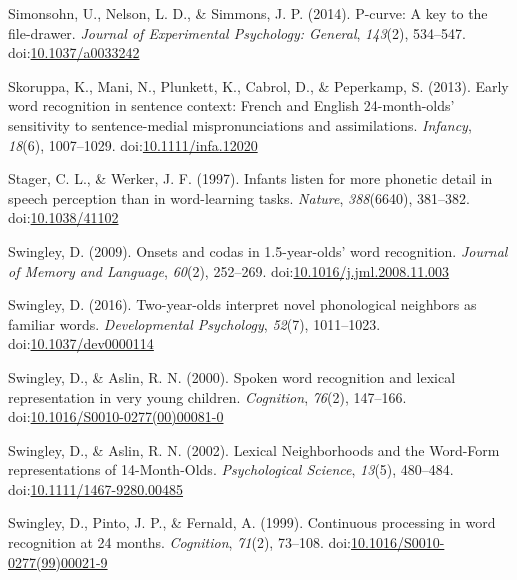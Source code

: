 \documentclass[man]{apa6}
\begin{document}
\leavevmode\hypertarget{ref-pcurve}{}%
Simonsohn, U., Nelson, L. D., \& Simmons, J. P. (2014). P-curve: A key to the file-drawer. \emph{Journal of Experimental Psychology: General}, \emph{143}(2), 534--547. doi:\href{https://doi.org/10.1037/a0033242}{10.1037/a0033242}

\leavevmode\hypertarget{ref-Skoruppa2013}{}%
Skoruppa, K., Mani, N., Plunkett, K., Cabrol, D., \& Peperkamp, S. (2013). Early word recognition in sentence context: French and English 24-month-olds' sensitivity to sentence-medial mispronunciations and assimilations. \emph{Infancy}, \emph{18}(6), 1007--1029. doi:\href{https://doi.org/10.1111/infa.12020}{10.1111/infa.12020}

\leavevmode\hypertarget{ref-Stager1997}{}%
Stager, C. L., \& Werker, J. F. (1997). Infants listen for more phonetic detail in speech perception than in word-learning tasks. \emph{Nature}, \emph{388}(6640), 381--382. doi:\href{https://doi.org/10.1038/41102}{10.1038/41102}

\leavevmode\hypertarget{ref-Swingley2009}{}%
Swingley, D. (2009). Onsets and codas in 1.5-year-olds' word recognition. \emph{Journal of Memory and Language}, \emph{60}(2), 252--269. doi:\href{https://doi.org/10.1016/j.jml.2008.11.003}{10.1016/j.jml.2008.11.003}

\leavevmode\hypertarget{ref-Swingley2016}{}%
Swingley, D. (2016). Two-year-olds interpret novel phonological neighbors as familiar words. \emph{Developmental Psychology}, \emph{52}(7), 1011--1023. doi:\href{https://doi.org/10.1037/dev0000114}{10.1037/dev0000114}

\leavevmode\hypertarget{ref-Swingley2000}{}%
Swingley, D., \& Aslin, R. N. (2000). Spoken word recognition and lexical representation in very young children. \emph{Cognition}, \emph{76}(2), 147--166. doi:\href{https://doi.org/10.1016/S0010-0277(00)00081-0}{10.1016/S0010-0277(00)00081-0}

\leavevmode\hypertarget{ref-Swingley2002}{}%
Swingley, D., \& Aslin, R. N. (2002). Lexical Neighborhoods and the Word-Form representations of 14-Month-Olds. \emph{Psychological Science}, \emph{13}(5), 480--484. doi:\href{https://doi.org/10.1111/1467-9280.00485}{10.1111/1467-9280.00485}

\leavevmode\hypertarget{ref-Swingley1999}{}%
Swingley, D., Pinto, J. P., \& Fernald, A. (1999). Continuous processing in word recognition at 24 months. \emph{Cognition}, \emph{71}(2), 73--108. doi:\href{https://doi.org/10.1016/S0010-0277(99)00021-9}{10.1016/S0010-0277(99)00021-9}
\end{document}
